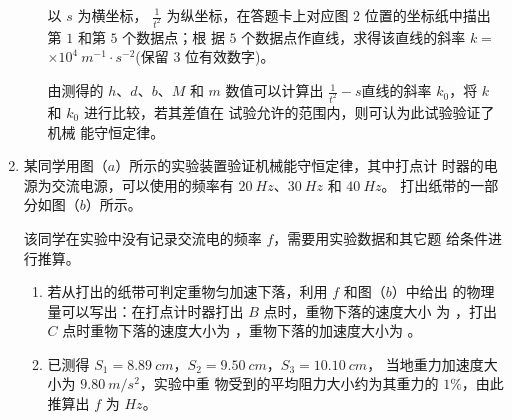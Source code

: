 \begin{enumerate}
\begin{enumerate}
以 $ s $ 为横坐标，
$\frac{1}{t^{2}}$
为纵坐标，在答题卡上对应图 $ 2 $ 位置的坐标纸中描出第 $ 1 $ 和第 $ 5 $ 个数据点；根
据 $ 5 $ 个数据点作直线，求得该直线的斜率 $ k= $
$ \times 10^{4} \ m^{-1} \cdot s^{-2} $(保留 $ 3 $ 位有效数字)。
\vspace{-3em}
\begin{figure}[h!]
\centering

\end{figure}

\banswer{
  
}


由测得的 $ h $、$ d $、$ b $、$ M $ 和 $ m $ 数值可以计算出
$\frac{1}{t^{2}}-s$直线的斜率 $ k_{0} $，将 $ k $ 和 $ k_{0} $ 进行比较，若其差值在
试验允许的范围内，则可认为此试验验证了机械
能守恒定律。

\end{enumerate}




\newpage
\item
{}
某同学用图（$ a $）所示的实验装置验证机械能守恒定律，其中打点计
时器的电源为交流电源，可以使用的频率有 $ 20 \ Hz $、$ 30 \ Hz $ 和 $ 40 \ Hz $。
打出纸带的一部分如图（$ b $）所示。
\begin{figure}[h!]
\centering
 \qquad  
\end{figure}


该同学在实验中没有记录交流电的频率 $ f $，需要用实验数据和其它题
给条件进行推算。

\begin{enumerate}
\renewcommand{\labelenumi}{\arabic{enumi}.}
\item
若从打出的纸带可判定重物匀加速下落，利用 $ f $ 和图（$ b $）中给出
的物理量可以写出：在打点计时器打出 $ B $ 点时，重物下落的速度大小
为  ，打出 $ C $ 点时重物下落的速度大小为  
，重物下落的加速度大小为  
。



\item 
已测得 $ S_1=8.89 \ cm $，$ S_2=9.50 \ cm $，$ S_3=10.10 \ cm $， 当地重力加速度大小为 $ 9.80 \ m/s^{2} $，实验中重
物受到的平均阻力大小约为其重力的 $ 1 \% $，由此推算出 $ f $ 为  $ Hz $。



\end{enumerate}
\end{enumerate}
